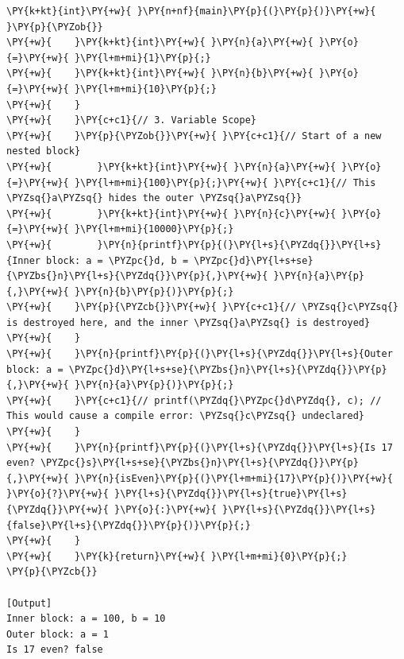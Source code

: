 \begin{Verbatim}[label=\makebox{\url{https://github.com/lucabaldini/cmepda/tree/master/slides/latex/snippets/functions_and_scope.c}},commandchars=\\\{\}]
\PY{k+kt}{int}\PY{+w}{ }\PY{n+nf}{main}\PY{p}{(}\PY{p}{)}\PY{+w}{ }\PY{p}{\PYZob{}}
\PY{+w}{    }\PY{k+kt}{int}\PY{+w}{ }\PY{n}{a}\PY{+w}{ }\PY{o}{=}\PY{+w}{ }\PY{l+m+mi}{1}\PY{p}{;}
\PY{+w}{    }\PY{k+kt}{int}\PY{+w}{ }\PY{n}{b}\PY{+w}{ }\PY{o}{=}\PY{+w}{ }\PY{l+m+mi}{10}\PY{p}{;}
\PY{+w}{    }
\PY{+w}{    }\PY{c+c1}{// 3. Variable Scope}
\PY{+w}{    }\PY{p}{\PYZob{}}\PY{+w}{ }\PY{c+c1}{// Start of a new nested block}
\PY{+w}{        }\PY{k+kt}{int}\PY{+w}{ }\PY{n}{a}\PY{+w}{ }\PY{o}{=}\PY{+w}{ }\PY{l+m+mi}{100}\PY{p}{;}\PY{+w}{ }\PY{c+c1}{// This \PYZsq{}a\PYZsq{} hides the outer \PYZsq{}a\PYZsq{}}
\PY{+w}{        }\PY{k+kt}{int}\PY{+w}{ }\PY{n}{c}\PY{+w}{ }\PY{o}{=}\PY{+w}{ }\PY{l+m+mi}{10000}\PY{p}{;}
\PY{+w}{        }\PY{n}{printf}\PY{p}{(}\PY{l+s}{\PYZdq{}}\PY{l+s}{Inner block: a = \PYZpc{}d, b = \PYZpc{}d}\PY{l+s+se}{\PYZbs{}n}\PY{l+s}{\PYZdq{}}\PY{p}{,}\PY{+w}{ }\PY{n}{a}\PY{p}{,}\PY{+w}{ }\PY{n}{b}\PY{p}{)}\PY{p}{;}
\PY{+w}{    }\PY{p}{\PYZcb{}}\PY{+w}{ }\PY{c+c1}{// \PYZsq{}c\PYZsq{} is destroyed here, and the inner \PYZsq{}a\PYZsq{} is destroyed}
\PY{+w}{    }
\PY{+w}{    }\PY{n}{printf}\PY{p}{(}\PY{l+s}{\PYZdq{}}\PY{l+s}{Outer block: a = \PYZpc{}d}\PY{l+s+se}{\PYZbs{}n}\PY{l+s}{\PYZdq{}}\PY{p}{,}\PY{+w}{ }\PY{n}{a}\PY{p}{)}\PY{p}{;}
\PY{+w}{    }\PY{c+c1}{// printf(\PYZdq{}\PYZpc{}d\PYZdq{}, c); // This would cause a compile error: \PYZsq{}c\PYZsq{} undeclared}
\PY{+w}{    }
\PY{+w}{    }\PY{n}{printf}\PY{p}{(}\PY{l+s}{\PYZdq{}}\PY{l+s}{Is 17 even? \PYZpc{}s}\PY{l+s+se}{\PYZbs{}n}\PY{l+s}{\PYZdq{}}\PY{p}{,}\PY{+w}{ }\PY{n}{isEven}\PY{p}{(}\PY{l+m+mi}{17}\PY{p}{)}\PY{+w}{ }\PY{o}{?}\PY{+w}{ }\PY{l+s}{\PYZdq{}}\PY{l+s}{true}\PY{l+s}{\PYZdq{}}\PY{+w}{ }\PY{o}{:}\PY{+w}{ }\PY{l+s}{\PYZdq{}}\PY{l+s}{false}\PY{l+s}{\PYZdq{}}\PY{p}{)}\PY{p}{;}
\PY{+w}{    }
\PY{+w}{    }\PY{k}{return}\PY{+w}{ }\PY{l+m+mi}{0}\PY{p}{;}
\PY{p}{\PYZcb{}}

[Output]
Inner block: a = 100, b = 10
Outer block: a = 1
Is 17 even? false
\end{Verbatim}